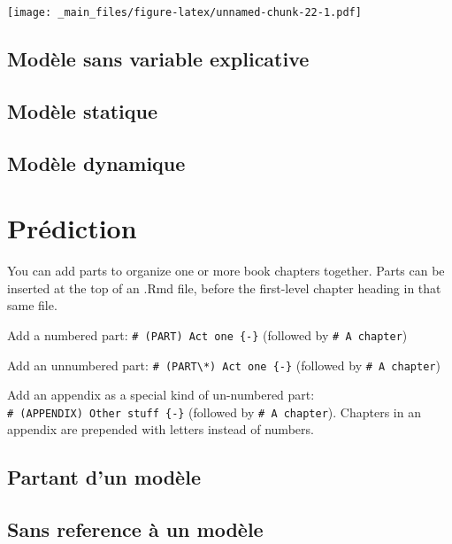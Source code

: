 \documentclass[
]{book}
\theoremstyle{definition}
\theoremstyle{definition}
\theoremstyle{definition}
\theoremstyle{definition}
\theoremstyle{remark}
\begin{document}
\texttt{[image: \_main\_files/figure-latex/unnamed-chunk-22-1.pdf]}

\hypertarget{moduxe8le-sans-variable-explicative}{%
\section{Modèle sans variable explicative}\label{moduxe8le-sans-variable-explicative}}

\hypertarget{moduxe8le-statique}{%
\section{Modèle statique}\label{moduxe8le-statique}}

\hypertarget{moduxe8le-dynamique}{%
\section{Modèle dynamique}\label{moduxe8le-dynamique}}

\hypertarget{pruxe9diction}{%
\chapter{Prédiction}\label{pruxe9diction}}

You can add parts to organize one or more book chapters together. Parts can be inserted at the top of an .Rmd file, before the first-level chapter heading in that same file.

Add a numbered part: \texttt{\#\ (PART)\ Act\ one\ \{-\}} (followed by \texttt{\#\ A\ chapter})

Add an unnumbered part: \texttt{\#\ (PART\textbackslash{}*)\ Act\ one\ \{-\}} (followed by \texttt{\#\ A\ chapter})

Add an appendix as a special kind of un-numbered part: \texttt{\#\ (APPENDIX)\ Other\ stuff\ \{-\}} (followed by \texttt{\#\ A\ chapter}). Chapters in an appendix are prepended with letters instead of numbers.

\hypertarget{partant-dun-moduxe8le}{%
\section{Partant d'un modèle}\label{partant-dun-moduxe8le}}

\hypertarget{sans-reference-uxe0-un-moduxe8le}{%
\section{Sans reference à un modèle}\label{sans-reference-uxe0-un-moduxe8le}}
\end{document}
